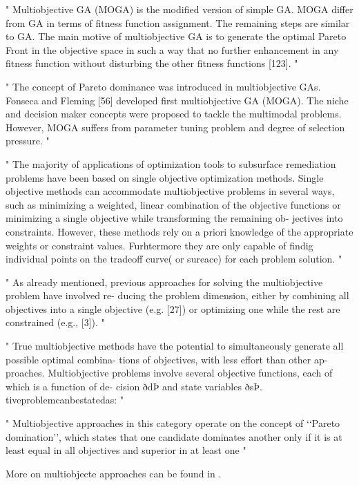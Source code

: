 "
Multiobjective GA (MOGA) is the modified version of simple GA. MOGA differ from GA in terms of fitness function assignment. The remaining steps are similar to GA. The main motive of multiobjective GA is to generate the optimal Pareto Front in the objective space in such a way that no further enhancement in any fitness function without disturbing the other fitness functions [123].
"\cite{katoch_review_2021}


"
The concept of Pareto dominance was introduced in multiobjective GAs. Fonseca and Fleming [56] developed first multiobjective GA (MOGA). The niche and decision maker concepts were proposed to tackle the multimodal problems. However, MOGA suffers from parameter tuning problem and degree of selection pressure.
"\cite{katoch_review_2021}

"
The majority of applications of optimization tools to subsurface remediation problems have been based on single objective optimization methods. Single objective methods can accommodate multiobjective problems in several ways, such as minimizing a weighted, linear combination of the objective functions or minimizing a single objective while transforming the remaining ob- jectives into constraints. However, these methods rely on a priori knowledge of the appropriate weights or constraint values. Furhtermore they are only capable of findig individual points on the tradeoff curve( or sureace) for each problem solution.
"\cite{erickson_multi-objective_2002}

"
As already mentioned, previous approaches for solving the multiobjective problem have involved re- ducing the problem dimension, either by combining all objectives into a single objective (e.g. [27]) or optimizing one while the rest are constrained (e.g., [3]).
"\cite{erickson_multi-objective_2002}

"
True multiobjective methods have the potential to simultaneously generate all possible optimal combina- tions of objectives, with less effort than other ap- proaches. Multiobjective problems involve several objective functions, each of which is a function of de- cision ðdÞ and state variables ðsÞ. tiveproblemcanbestatedas:
"\cite{erickson_multi-objective_2002}

"
Multiobjective approaches in this category operate on the concept of ‘‘Pareto domination’’, which states that one candidate dominates another only if it is at least equal in all objectives and superior in at least one
"\cite{erickson_multi-objective_2002}

More on multiobjecte approaches can be found in \cite{erickson_multi-objective_2002}.

\fi










